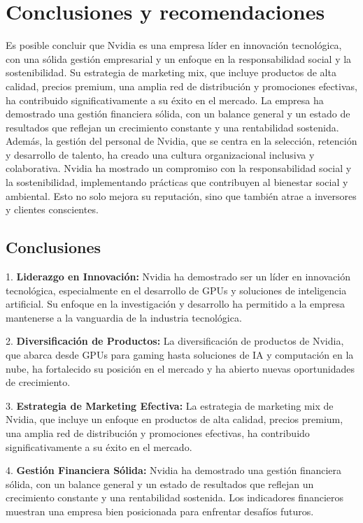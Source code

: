 \documentclass{article}
\begin{document}
\section{Conclusiones y recomendaciones}

Es posible concluir que Nvidia es una empresa líder en innovación tecnológica, con una sólida gestión empresarial y un enfoque en la responsabilidad social y la sostenibilidad. Su estrategia de marketing mix, que incluye productos de alta calidad, precios premium, una amplia red de distribución y promociones efectivas, ha contribuido significativamente a su éxito en el mercado. La empresa ha demostrado una gestión financiera sólida, con un balance general y un estado de resultados que reflejan un crecimiento constante y una rentabilidad sostenida. Además, la gestión del personal de Nvidia, que se centra en la selección, retención y desarrollo de talento, ha creado una cultura organizacional inclusiva y colaborativa. Nvidia ha mostrado un compromiso con la responsabilidad social y la sostenibilidad, implementando prácticas que contribuyen al bienestar social y ambiental. Esto no solo mejora su reputación, sino que también atrae a inversores y clientes conscientes.

\subsection{Conclusiones}

1. \textbf{Liderazgo en Innovación:} Nvidia ha demostrado ser un líder en innovación tecnológica, especialmente en el desarrollo de GPUs y soluciones de inteligencia artificial. Su enfoque en la investigación y desarrollo ha permitido a la empresa mantenerse a la vanguardia de la industria tecnológica.

2. \textbf{Diversificación de Productos:} La diversificación de productos de Nvidia, que abarca desde GPUs para gaming hasta soluciones de IA y computación en la nube, ha fortalecido su posición en el mercado y ha abierto nuevas oportunidades de crecimiento.

3. \textbf{Estrategia de Marketing Efectiva:} La estrategia de marketing mix de Nvidia, que incluye un enfoque en productos de alta calidad, precios premium, una amplia red de distribución y promociones efectivas, ha contribuido significativamente a su éxito en el mercado.

4. \textbf{Gestión Financiera Sólida:} Nvidia ha demostrado una gestión financiera sólida, con un balance general y un estado de resultados que reflejan un crecimiento constante y una rentabilidad sostenida. Los indicadores financieros muestran una empresa bien posicionada para enfrentar desafíos futuros.
\end{document}
